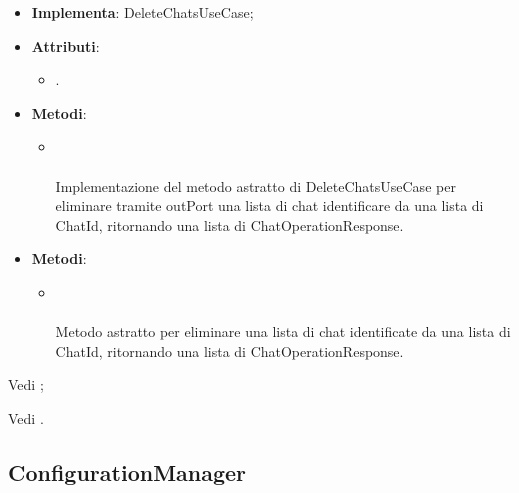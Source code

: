 \documentclass[10pt, a4paper]{article}
\begin{document}
\label{DeleteChatsServiceDettaglio}
\begin{itemize}
    \item \textbf{Implementa}: DeleteChatsUseCase;
    \item \textbf{Attributi}:
    \begin{itemize}
        \item {}.
    \end{itemize}
    \item \textbf{Metodi}:
    \begin{itemize}
        \item {}\\ \\
        Implementazione del metodo astratto di DeleteChatsUseCase per eliminare tramite outPort una lista di chat identificare da una lista di ChatId, ritornando una lista di ChatOperationResponse.
    \end{itemize}
\end{itemize}

\label{DeleteChatsUseCaseDettaglio}
\begin{itemize}
    \item \textbf{Metodi}:
    \begin{itemize}
        \item {}\\ \\
        Metodo astratto per eliminare una lista di chat identificate da una lista di ChatId, ritornando una lista di ChatOperationResponse.
    \end{itemize}
\end{itemize}



Vedi ;








Vedi .






\subsection{ConfigurationManager}
\end{document}

